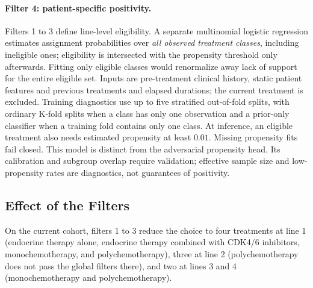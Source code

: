 \documentclass[a4paper,10pt]{article}
\begin{document}
\paragraph{Filter 4: patient-specific positivity.} Filters 1 to 3 define line-level eligibility. A separate multinomial logistic regression estimates assignment probabilities over \emph{all observed treatment classes}, including ineligible ones; eligibility is intersected with the propensity threshold only afterwards. Fitting only eligible classes would renormalize away lack of support for the entire eligible set. Inputs are pre-treatment clinical history, static patient features and previous treatments and elapsed durations; the current treatment is excluded. Training diagnostics use up to five stratified out-of-fold splits, with ordinary K-fold splits when a class has only one observation and a prior-only classifier when a training fold contains only one class. At inference, an eligible treatment also needs estimated propensity at least $0.01$. Missing propensity fits fail closed. This model is distinct from the adversarial propensity head. Its calibration and subgroup overlap require validation; effective sample size and low-propensity rates are diagnostics, not guarantees of positivity.

\subsection{Effect of the Filters}

On the current cohort, filters 1 to 3 reduce the choice to four treatments at line 1 (endocrine therapy alone, endocrine therapy combined with CDK4/6 inhibitors, monochemotherapy, and polychemotherapy), three at line 2 (polychemotherapy does not pass the global filters there), and two at lines 3 and 4 (monochemotherapy and polychemotherapy).
\end{document}
